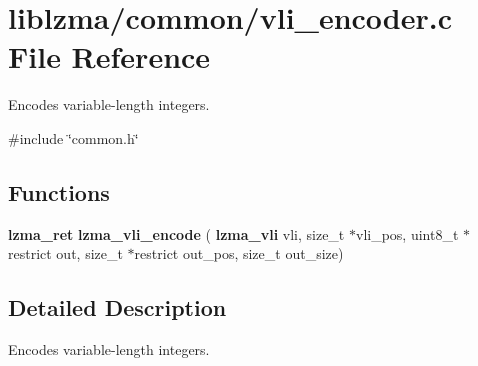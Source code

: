 \section{liblzma/common/vli\+\_\+encoder.c File Reference}
\label{vli__encoder_8c}


Encodes variable-\/length integers.  


{\ttfamily \#include \char`\"{}common.\+h\char`\"{}}\newline
\subsection*{Functions}
\begin{DoxyCompactItemize}
\item 
\mbox{\label{vli__encoder_8c_ab803b0f6087cf18e177952b88620d846}} 
\textbf{ lzma\+\_\+ret} {\bfseries lzma\+\_\+vli\+\_\+encode} (\textbf{ lzma\+\_\+vli} vli, size\+\_\+t $\ast$vli\+\_\+pos, uint8\+\_\+t $\ast$restrict out, size\+\_\+t $\ast$restrict out\+\_\+pos, size\+\_\+t out\+\_\+size)
\end{DoxyCompactItemize}


\subsection{Detailed Description}
Encodes variable-\/length integers. 

